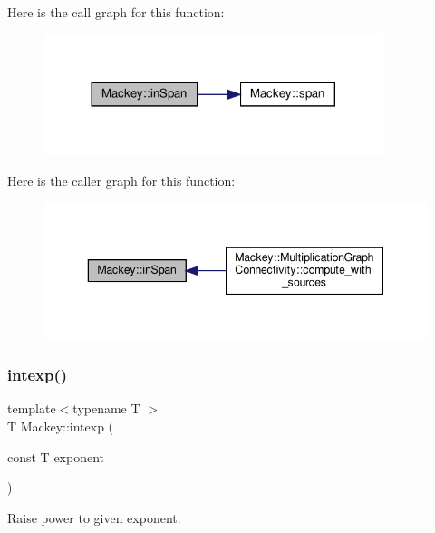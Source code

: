 Here is the call graph for this function\+:\nopagebreak
\begin{figure}[H]
\begin{center}
\leavevmode
\includegraphics[width=281pt]{namespaceMackey_a1ff253bf7e043ad6455b5fea23a83f09_cgraph}
\end{center}
\end{figure}
Here is the caller graph for this function\+:\nopagebreak
\begin{figure}[H]
\begin{center}
\leavevmode
\includegraphics[width=343pt]{namespaceMackey_a1ff253bf7e043ad6455b5fea23a83f09_icgraph}
\end{center}
\end{figure}
\mbox{\label{namespaceMackey_a4904fdc0fdcf3c23d7f3b80f59b2eafa}} 
\subsubsection{\texorpdfstring{intexp()}{intexp()}}
{\footnotesize\ttfamily template$<$typename T $>$ \\
T Mackey\+::intexp (\begin{DoxyParamCaption}\item[{const T}]{exponent }\end{DoxyParamCaption})\hspace{0.3cm}{\ttfamily [inline]}}



Raise power to given exponent. 

